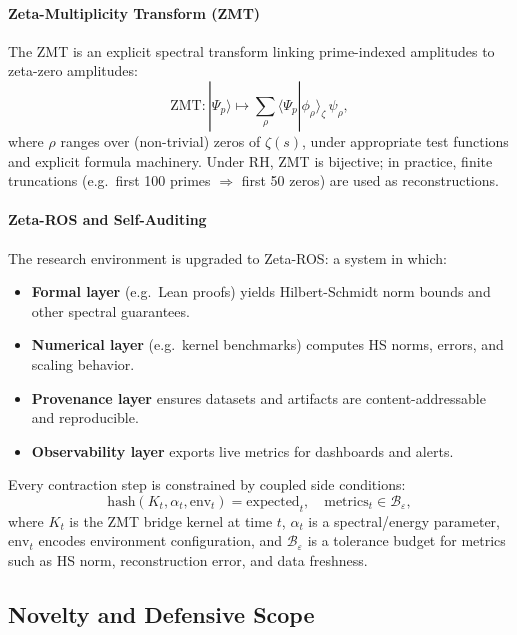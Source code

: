 \documentclass[11pt]{article}
\begin{document}
\paragraph{Zeta-Multiplicity Transform (ZMT)}

The ZMT is an explicit spectral transform linking prime-indexed amplitudes to zeta-zero amplitudes:
\[
\mathrm{ZMT} : |\Psi_p\rangle \mapsto
\sum_{\rho}
  \langle \Psi_p | \phi_\rho \rangle_\zeta \,\psi_\rho,
\]
where $\rho$ ranges over (non-trivial) zeros of $\zeta(s)$, under appropriate test functions and explicit formula machinery. Under RH, ZMT is bijective; in practice, finite truncations (e.g.\ first 100 primes $\Rightarrow$ first 50 zeros) are used as reconstructions.

\paragraph{Zeta-ROS and Self-Auditing}

The research environment is upgraded to Zeta-ROS: a system in which:

\begin{itemize}[leftmargin=*]
  \item \textbf{Formal layer} (e.g.\ Lean proofs) yields Hilbert-Schmidt norm bounds and other spectral guarantees.
  \item \textbf{Numerical layer} (e.g.\ kernel benchmarks) computes HS norms, errors, and scaling behavior.
  \item \textbf{Provenance layer} ensures datasets and artifacts are content-addressable and reproducible.
  \item \textbf{Observability layer} exports live metrics for dashboards and alerts.
\end{itemize}

Every contraction step is constrained by coupled side conditions:
\[
\mathrm{hash}(K_t,\alpha_t,\mathrm{env}_t) = \mathrm{expected}_t,
\quad
\mathrm{metrics}_t \in \mathcal{B}_\varepsilon,
\]
where $K_t$ is the ZMT bridge kernel at time $t$, $\alpha_t$ is a spectral/energy parameter, $\mathrm{env}_t$ encodes environment configuration, and $\mathcal{B}_\varepsilon$ is a tolerance budget for metrics such as HS norm, reconstruction error, and data freshness.

\subsection{Novelty and Defensive Scope}
\end{document}

